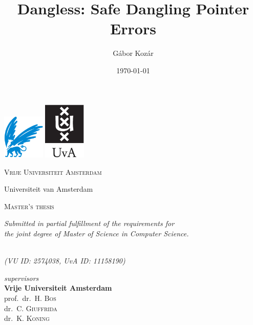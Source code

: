 \documentclass[12pt]{report}%
\title{Dangless: Safe Dangling Pointer Errors}
\author{Gábor Kozár}
\date{\today}
\begin{document}
\makeatletter
\begin{titlepage}
	\centering
	\includegraphics[width=0.15\textwidth, trim={0 0.15cm 0 0}, clip]{img/vu.png} \hspace{1.3cm}
	\includegraphics[width=0.15\textwidth, trim={0 0.74cm 0 0}, clip]{img/uva.eps}\par\vspace{1cm}
	{\scshape\huge Vrije Universiteit Amsterdam \par Universiteit van Amsterdam \par}

	\vspace{1.5cm}

	{\scshape\LARGE Master's thesis\par \par
		\vspace{0.2cm}
		\small \textit{Submitted in partial fulfillment of the requirements for\\ the joint degree of Master of Science in Computer Science.}\par}
	\vspace{1.5cm}

	{\Huge\bfseries \rm \textbf{\@title}\par}
	\vspace{1.5cm}

	{\Large\itshape\rm \noindent\textit{\@author}\\}
	\vspace{1mm}
	\textit{(VU ID: 2574038, UvA ID: 11158190)}
	\vfill

	\rm \noindent \textit{supervisors} \\ \vspace{0.15cm}
	\rm \textbf{Vrije Universiteit Amsterdam} \\
	prof.\ dr.\ H. \textsc{Bos} \\
	dr.\ C. \textsc{Giuffrida} \\
	dr.\ K. \textsc{Koning}
	\vfill
	
	{\large \@date\par}
\end{titlepage}
\makeatother
\end{document}

